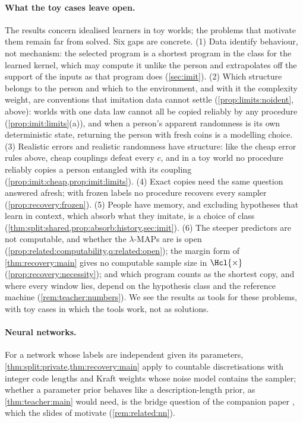 \paragraph{What the toy cases leave open.} The results concern idealised learners in toy worlds; the problems that motivate them remain far from solved. Six gaps are concrete. (1) Data identify behaviour, not mechanism: the selected program is a shortest program in the class for the learned kernel, which may compute it unlike the person and extrapolates off the support of the inputs as that program does (\cref{sec:imit}). (2) Which structure belongs to the person and which to the environment, and with it the complexity weight, are conventions that imitation data cannot settle (\cref{prop:limits:noident}, above): worlds with one data law cannot all be copied reliably by any procedure (\cref{prop:imit:limits}(a)), and when a person's apparent randomness is its own deterministic state, returning the person with fresh coins is a modelling choice. (3) Realistic errors and realistic randomness have structure: like the cheap error rules above, cheap couplings defeat every $c$, and in a toy world no procedure reliably copies a person entangled with its coupling (\cref{prop:imit:cheap,prop:imit:limits}). (4) Exact copies need the same question answered afresh; with frozen labels no procedure recovers every sampler (\cref{prop:recovery:frozen}). (5) People have memory, and excluding hypotheses that learn in context, which absorb what they imitate, is a choice of class (\cref{thm:split:shared,prop:absorb:history,sec:imit}). (6) The steeper predictors are not computable, and whether the $\lambda$-MAPs are is open (\cref{prop:related:computability,q:related:open}); the margin form of \cref{thm:recovery:main} gives no computable sample size in $\Hcl{\times}$ (\cref{prop:recovery:necessity}); and which program counts as the shortest copy, and where every window lies, depend on the hypothesis class and the reference machine (\cref{rem:teacher:numbers}). We see the results as tools for these problems, with toy cases in which the tools work, not as solutions.

\paragraph{Neural networks.} For a network whose labels are independent given its parameters, \cref{thm:split:private,thm:recovery:main} apply to countable discretisations with integer code lengths and Kraft weights whose noise model contains the sampler; whether a parameter prior behaves like a description-length prior, as \cref{thm:teacher:main} would need, is the bridge question of the companion paper \citep[Question~10.9]{claudeSFI2026fundamentals}, which the slides of \citet{vaintrobhanni2026nnbayes} motivate (\cref{rem:related:nn}).%

